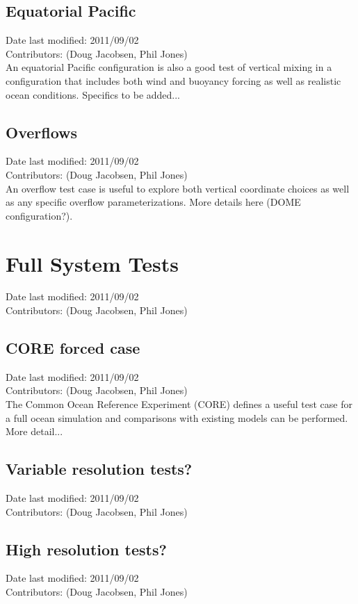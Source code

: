 \documentclass[11pt]{report}
\begin{document}
\subsection{Equatorial Pacific}
Date last modified: 2011/09/02 \\
Contributors: (Doug Jacobsen, Phil Jones) \\

An equatorial Pacific configuration is also a good test of vertical
mixing in a configuration that includes both wind and buoyancy forcing
as well as realistic ocean conditions.  Specifics to be added...

\subsection{Overflows}
Date last modified: 2011/09/02 \\
Contributors: (Doug Jacobsen, Phil Jones) \\

An overflow test case is useful to explore both vertical coordinate
choices as well as any specific overflow parameterizations.  More
details here (DOME configuration?).


\section{Full System Tests}
Date last modified: 2011/09/02 \\
Contributors: (Doug Jacobsen, Phil Jones) \\

\subsection{CORE forced case}
Date last modified: 2011/09/02 \\
Contributors: (Doug Jacobsen, Phil Jones) \\

The Common Ocean Reference Experiment (CORE) defines a useful test case
for a full ocean simulation and comparisons with existing models can
be performed.  More detail...

\subsection{Variable resolution tests?}
Date last modified: 2011/09/02 \\
Contributors: (Doug Jacobsen, Phil Jones) \\

\subsection{High resolution tests?}
Date last modified: 2011/09/02 \\
Contributors: (Doug Jacobsen, Phil Jones) \\

\end{document}

